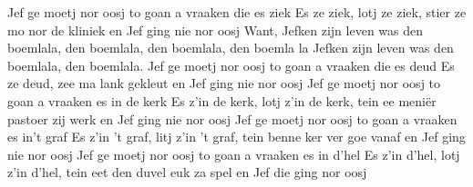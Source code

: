 \beginverse
Jef ge moetj nor oosj to goan a vraaken die es ziek 
Es ze ziek, lotj ze ziek, stier ze mo nor de kliniek
en Jef ging nie nor oosj 
\endverse
\beginchorus
Want, Jefken zijn leven was den boemlala, den boemlala, den boemlala, den boemla la
Jefken zijn leven was den boemlala, den boemlala. 
\endchorus
\beginverse
Jef ge moetj nor oosj to goan a vraaken die es deud	
Es ze deud, zee ma lank gekleut
en Jef ging nie nor oosj	
\endverse
\beginverse
Jef ge moetj nor oosj to goan a vraaken es in de kerk	
Es z’in de kerk, lotj z’in de kerk, tein ee meniër pastoer zij werk
en Jef ging nie nor oosj 
\endverse
\beginverse
Jef ge moetj nor oosj to goan a vraaken es in’t graf 
Es z’in 't graf, litj z’in 't graf, tein benne ker ver goe vanaf
en Jef ging nie nor oosj 
\endverse
\beginverse
Jef ge moetj nor oosj to goan a vraaken es in d’hel	
Es z’in d’hel, lotj z’in d’hel, tein eet den duvel euk za spel
en Jef die ging nor oosj 
\endverse
\endsong